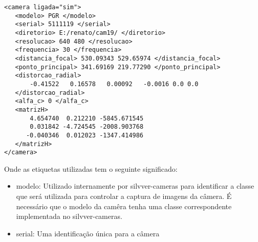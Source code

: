 \documentclass[a4paper,10pt]{article}
\begin{document}
\begin{verbatim}
<camera ligada="sim">
   <modelo> PGR </modelo>
   <serial> 5111119 </serial>
   <diretorio> E:/renato/cam19/ </diretorio>
   <resolucao> 640 480 </resolucao>
   <frequencia> 30 </frequencia>
   <distancia_focal> 530.09343 529.65974 </distancia_focal>
   <ponto_principal> 341.69169 219.77290 </ponto_principal>
   <distorcao_radial>
       -0.41522   0.16578   0.00092   -0.0016 0.0 0.0
   </distorcao_radial>
   <alfa_c> 0 </alfa_c>
   <matrizH>
       4.654740  0.212210 -5845.671545
       0.031842 -4.724545 -2008.903768
      -0.040346  0.012023 -1347.414986
   </matrizH>
</camera>
\end{verbatim}

Onde as etiquetas utilizadas tem o seguinte significado:
\begin{itemize}
\item modelo: Utilizado internamente por silvver-cameras para
  identificar a classe que será utilizada para controlar a captura de
  imagens da câmera. É necessário que o modelo da camêra tenha uma
  classe correspondente implementada no silvver-cameras.
\item serial: Uma identificação única para a câmera
\end{itemize}



% 
\end{document}
